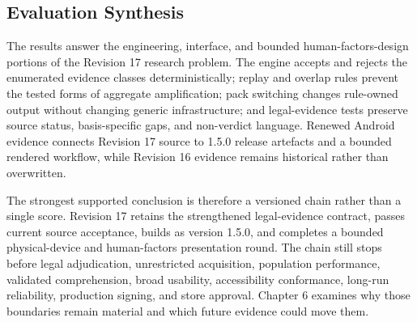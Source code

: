 \subsection{Evaluation Synthesis}

The results answer the engineering, interface, and bounded human-factors-design portions of the Revision 17 research problem. The engine accepts and rejects the enumerated evidence classes deterministically; replay and overlap rules prevent the tested forms of aggregate amplification; pack switching changes rule-owned output without changing generic infrastructure; and legal-evidence tests preserve source status, basis-specific gaps, and non-verdict language. Renewed Android evidence connects Revision 17 source to 1.5.0 release artefacts and a bounded rendered workflow, while Revision 16 evidence remains historical rather than overwritten.

The strongest supported conclusion is therefore a versioned chain rather than a single score. Revision 17 retains the strengthened legal-evidence contract, passes current source acceptance, builds as version 1.5.0, and completes a bounded physical-device and human-factors presentation round. The chain still stops before legal adjudication, unrestricted acquisition, population performance, validated comprehension, broad usability, accessibility conformance, long-run reliability, production signing, and store approval. Chapter 6 examines why those boundaries remain material and which future evidence could move them.
